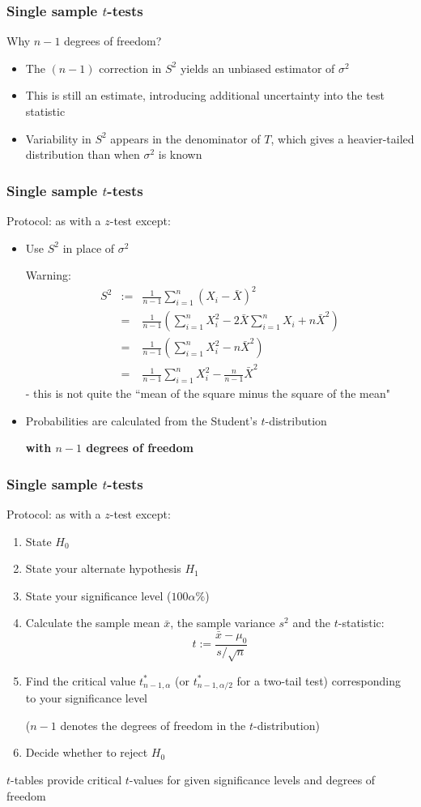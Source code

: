 \documentclass[t,8pt]{beamer}
\begin{document}
\begin{frame}
	\frametitle{Single sample $t$-tests} 
	Why $n-1$ degrees of freedom?
	\begin{itemize}
		\item The $(n-1)$ correction in $S^2$ yields an unbiased estimator of $\sigma^2$
		\item This is still an estimate, introducing additional uncertainty into the test statistic
		\item Variability in $S^2$ appears in the denominator of $T$, which gives a heavier-tailed distribution than when $\sigma^2$ is known
	\end{itemize}
\end{frame}

\begin{frame}
	\frametitle{Single sample $t$-tests} 
	Protocol: as with a $z$-test except:
	\begin{itemize}
		\item Use $S^2$ in place of $\sigma^2$ \par
		Warning:
		\begin{eqnarray*}
			S^2&:=&\frac 1{n-1}\sum_{i=1}^n(X_i-\bar X)^2 \\[4pt]
			&=&\frac 1{n-1}\left(\sum_{i=1}^nX_i^2-2\bar X\sum_{i=1}^nX_i+n\bar X^2\right)\\[4pt]
			&=&\frac 1{n-1}\left(\sum_{i=1}^nX_i^2-n\bar X^2\right)\\[4pt]
			&=&\frac 1{n-1}\sum_{i=1}^nX_i^2-\frac n{n-1}\bar X^2
		\end{eqnarray*}
		- this is not quite the ``mean of the square minus the square of the mean"
		\item Probabilities are calculated from the Student's $t$-distribution \par
		{\bf with $n-1$ degrees of freedom}
	\end{itemize}
\end{frame}

\begin{frame}
	\frametitle{Single sample $t$-tests} 
	Protocol: as with a $z$-test except:
	\begin{enumerate}
		\item State $H_0$
		\item State your alternate hypothesis $H_1$
		\item State your significance level ($100\alpha\%$)
		\item Calculate the sample mean $\bar x$, the sample variance $s^2$ and the $t$-statistic:
		$$t:=\frac{\bar x-\mu_0}{s/\sqrt{n}}$$
		\item Find the critical value $t^*_{n-1,\alpha}$ (or $t^*_{n-1,\alpha/2}$ for a two-tail test) corresponding to your significance level \par
		($n-1$ denotes the degrees of freedom in the $t$-distribution)
		\item Decide whether to reject $H_0$
	\end{enumerate}
	{\small\color{NavyBlue} $t$-tables provide critical $t$-values for given significance levels and degrees of freedom}
\end{frame}
\end{document}
